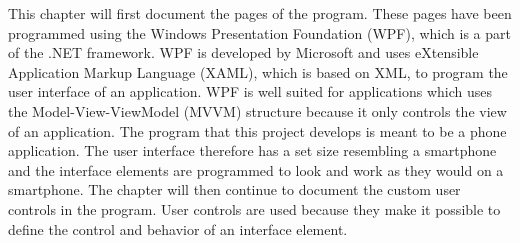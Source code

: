 This chapter will first document the pages of the program. These pages have been programmed using the Windows Presentation Foundation (WPF), which is a part of the .NET framework. WPF is developed by Microsoft and uses eXtensible Application Markup Language (XAML), which is based on XML, to program the user interface of an application. WPF is well suited for applications which uses the Model-View-ViewModel (MVVM) structure because it only controls the view of an application. The program that this project develops is meant to be a phone application. The user interface therefore has a set size resembling a smartphone and the interface elements are programmed to look and work as they would on a smartphone. The chapter will then continue to document the custom user controls in the program. User controls are used because they make it possible to define the control and behavior of an interface element. 